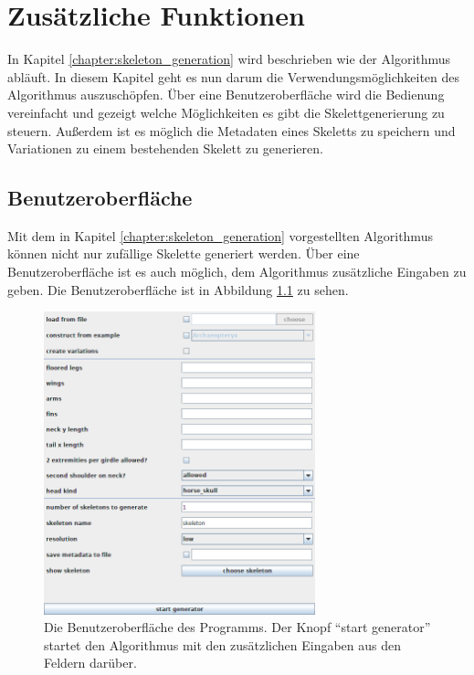 \chapter{Zusätzliche Funktionen}
\label{chapter:additional_features}

In Kapitel \ref{chapter:skeleton_generation} wird beschrieben wie der Algorithmus abläuft. In diesem Kapitel geht es nun darum die Verwendungsmöglichkeiten des Algorithmus auszuschöpfen. Über eine Benutzeroberfläche wird die Bedienung vereinfacht und gezeigt welche Möglichkeiten es gibt die Skelettgenerierung zu steuern. Außerdem ist es möglich die Metadaten eines Skeletts zu speichern und Variationen zu einem bestehenden Skelett zu generieren.


\section{Benutzeroberfläche}
\label{gui}

Mit dem in Kapitel \ref{chapter:skeleton_generation} vorgestellten Algorithmus können nicht nur zufällige Skelette generiert werden. Über eine Benutzeroberfläche ist es auch möglich, dem Algorithmus zusätzliche Eingaben zu geben. Die Benutzeroberfläche ist in Abbildung \ref{gui_screenshot} zu sehen.

\begin{figure}
 \centering
 \includegraphics[width=0.7\textwidth]{graphics/gui.png}
 \caption{Die Benutzeroberfläche des Programms. Der Knopf "`start generator"' startet den Algorithmus mit den zusätzlichen Eingaben aus den Feldern darüber.}
 \label{gui_screenshot}
\end{figure}

